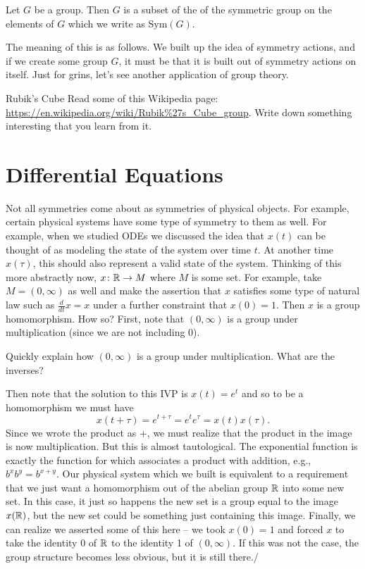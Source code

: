 \documentclass{article}
\theoremstyle{indented}
\begin{document}
\begin{theorem}
    Let $G$ be a group. Then $G$ is a subset of the of the symmetric group on the elements of $G$ which we write as $\mathrm{Sym}(G)$.
\end{theorem}

The meaning of this is as follows. We built up the idea of symmetry actions, and if we create some group $G$, it must be that it is built out of symmetry actions on itself. Just for grins, let's see another application of group theory.

\begin{problem}{Rubik's Cube}{}
Read some of this Wikipedia page: \url{https://en.wikipedia.org/wiki/Rubik%27s_Cube_group}. Write down something interesting that you learn from it.
\end{problem}

\section{Differential Equations}

Not all symmetries come about as symmetries of physical objects. For example, certain physical systems have some type of symmetry to them as well. For example, when we studied ODEs we discussed the idea that $x(t)$ can be thought of as modeling the state of the system over time $t$. At another time $x(\tau)$, this should also represent a valid state of the system. Thinking of this more abstractly now, $x\colon \mathbb{R} \to M$ where $M$ is some set. For example, take $M=(0,\infty)$ as well and make the assertion that $x$ satisfies some type of natural law such as $\frac{d}{dt}x = x$ under a further constraint that $x(0)=1$. Then $x$ is a group homomorphism. How so? First, note that $(0,\infty)$ is a group under multiplication (since we are not including 0).
\begin{problem}{}{}
Quickly explain how $(0,\infty)$ is a group under multiplication. What are the inverses?
\end{problem}

Then note that the solution to this IVP is $x(t)=e^t$ and so to be a homomorphism we must have
\[
x(t+\tau) = e^{t+\tau} = e^t e^\tau = x(t)x(\tau).
\]
Since we wrote the product as $+$, we must realize that the product in the image is now multiplication. But this is almost tautological. The exponential function is exactly the function for which associates a product with addition, e.g., $b^xb^y = b^{x+y}$. Our physical system which we built is equivalent to a requirement that we just want a homomorphism out of the abelian group $\mathbb{R}$ into some new set. In this case, it just so happens the new set is a group equal to the image $x(\mathbb{R})$, but the new set could be something just containing this image. Finally, we can realize we asserted some of this here -- we took $x(0)=1$ and forced $x$ to take the identity $0$ of $\mathbb{R}$ to the identity 1 of $(0,\infty)$. If this was not the case, the group structure becomes less obvious, but it is still there./
\end{document}
